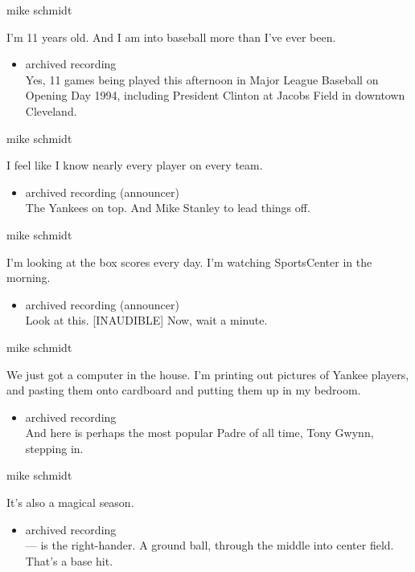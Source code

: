 mike schmidt

I'm 11 years old. And I am into baseball more than I've ever been.

\begin{itemize}
\tightlist
\item
  archived recording\\
  Yes, 11 games being played this afternoon in Major League Baseball on
  Opening Day 1994, including President Clinton at Jacobs Field in
  downtown Cleveland.
\end{itemize}

mike schmidt

I feel like I know nearly every player on every team.

\begin{itemize}
\tightlist
\item
  archived recording (announcer)\\
  The Yankees on top. And Mike Stanley to lead things off.
\end{itemize}

mike schmidt

I'm looking at the box scores every day. I'm watching SportsCenter in
the morning.

\begin{itemize}
\tightlist
\item
  archived recording (announcer)\\
  Look at this. {[}INAUDIBLE{]} Now, wait a minute.
\end{itemize}

mike schmidt

We just got a computer in the house. I'm printing out pictures of Yankee
players, and pasting them onto cardboard and putting them up in my
bedroom.

\begin{itemize}
\tightlist
\item
  archived recording\\
  And here is perhaps the most popular Padre of all time, Tony Gwynn,
  stepping in.
\end{itemize}

mike schmidt

It's also a magical season.

\begin{itemize}
\tightlist
\item
  archived recording\\
  --- is the right-hander. A ground ball, through the middle into center
  field. That's a base hit.
\end{itemize}

